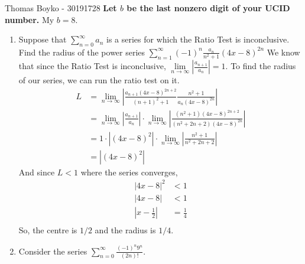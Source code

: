 \documentclass{article}
\begin{document}
    \huge Thomas Boyko - 30191728 \nl 
    \normalsize \textbf{Let $b$ be the last nonzero digit of your UCID number. }
    \nl My $b=8$.
    \begin{enumerate}
        \item Suppose that $\sum\limits_{n=0}^{\infty}a_n$ is a series for which the Ratio Test
        is inconclusive.
        \nl Find the radius of the power series $\sum\limits_{n=1}^\infty (-1)^n\frac{a_n}{n^2+1}(4x-8)^{2n}$
        \nl We know that since the Ratio Test is inconclusive, $\lim\limits_{n\to\infty} \left|\frac{a_{n+1}}{a_n}\right|=1$.
        \nl To find the radius of our series, we can run the ratio test on it.
        \begin{align*}
            L &= \lim_{n\to\infty}\left|\frac{a_{n+1}(4x-8)^{2n+2}}{(n+1)^2+1}\frac{n^2+1}{a_n(4x-8)^{2n}}   \right| \\
            &=\lim_{n\to\infty}\left|\frac{a_{n+1}}{a_n}\right|\cdot\lim_{n\to\infty}\left|\frac{(n^2+1)(4x-8)^{2n+2}}{(n^2+2n+2)(4x-8)^{2n}}\right|\\
            &=1\cdot\left|(4x-8)^2\right|\cdot\lim_{n\to\infty}\left|\frac{n^2+1}{n^2+2n+2}\right|\\
            &=|(4x-8)^2|
        \end{align*}
        And since $L<1$ where the series converges,
        \begin{align*}
            |4x-8|^2&<1\\
            |4x-8|&<1\\
            \left|x-\frac{1}{2}\right|&=\frac{1}{4}\\
        \end{align*}
        So, the centre is $1/2$ and the radius is $1/4$.
        \item Consider the series $\sum\limits_{n=0}^{\infty}\frac{(-1)^n9^n}{(2n)!}$.
\end{enumerate}
\end{document}
